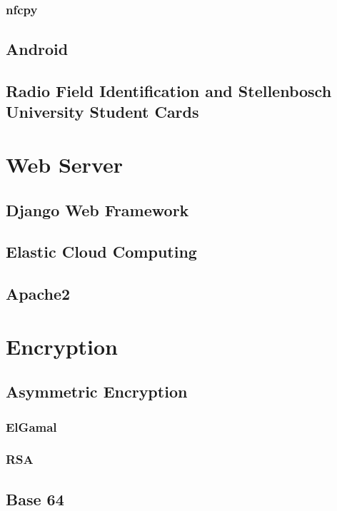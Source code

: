 \subsubsection{nfcpy}

\subsection{Android}

\subsection{Radio Field Identification and Stellenbosch
University Student Cards}

\section{Web Server}

\subsection{Django Web Framework}

\subsection{Elastic Cloud Computing}

\subsection{Apache2}

\section{Encryption}

\subsection{Asymmetric Encryption}

\subsubsection{ElGamal}

\subsubsection{RSA}

\subsection{Base 64}
